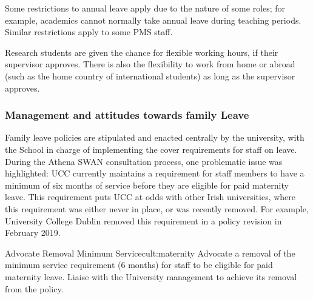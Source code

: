 

Some restrictions to annual leave apply due to the nature of some roles; for example, academics cannot normally take annual leave during teaching periods. Similar restrictions apply to some PMS staff. 

Research students are given the chance for flexible working hours, if their supervisor approves. There is also the flexibility to work from home or abroad (such as the home country of international students) as long as the supervisor approves.

\subsubsection{Management and attitudes towards family Leave}

Family leave policies are stipulated and enacted centrally by the university, with the School  in charge of implementing the cover requirements for staff on leave. 
During the Athena SWAN consultation process, one problematic issue was highlighted:
UCC currently maintains a requirement for staff members to have a minimum of six months of service before they are eligible for paid maternity leave. This requirement puts UCC at odds with other Irish universities, where this requirement was either never in place, or was recently removed. For example, University College Dublin removed this requirement in a policy revision in February 2019. %




\newcommand{\actcultmaternity}{Advocate a removal of the minimum service requirement (6 months) for staff to be eligible for paid maternity leave. Liaise with the University management to achieve its removal from the policy.}
\begin{actionblock}{\ksspace{}Advocate Removal Minimum Service}{cult:maternity}
\actcultmaternity
\hfill{
    \hypersetup{hidelinks}
    \hyperlink{e3}{\gotoactionsymbol{}}
}
\end{actionblock}


